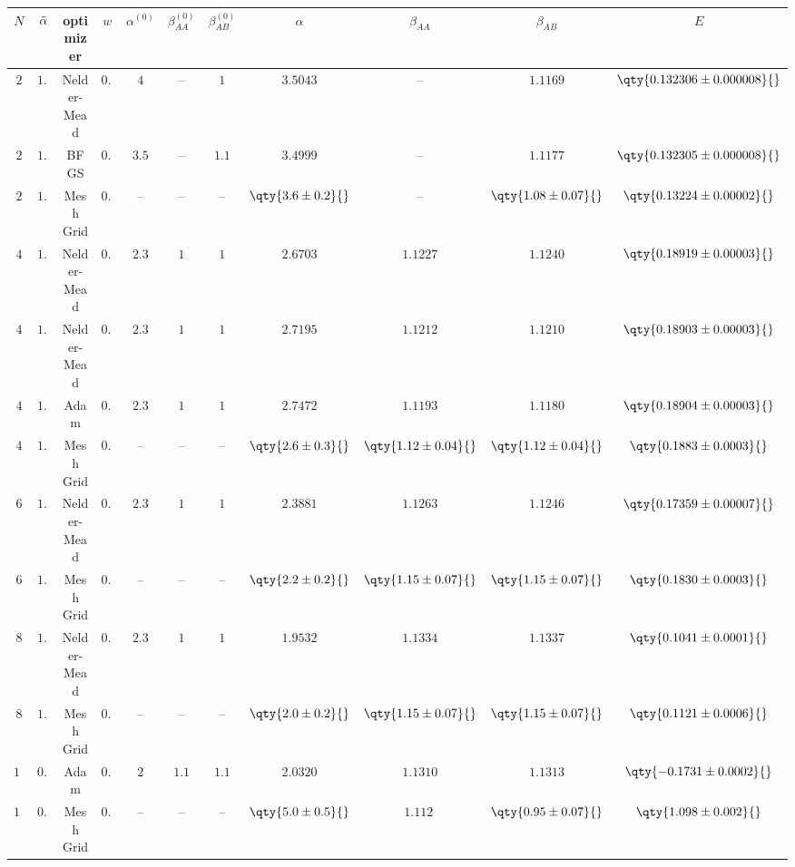 \begin{tabular}{cc|ccccc|cccc}
    $N$ & $\Tilde{\alpha}$ & optimizer & $w$ & $\alpha^{(0)}$ & $\beta_{AA}^{(0)}$ & $\beta_{AB}^{(0)}$ & $\alpha$ & $\beta_{AA}$ & $\beta_{AB}$ & $E$ \\ \hline \hline
    
    $2$ & $1.00$ & Nelder-Mead & $0.05$ & $4$ & -- & $1$ & $3.5043$ & -- & $1.1169$ & $\qty{0.132306 \pm 0.000008}{}$ \\
    \rowcolor{LightCyan}
    $2$ & $1.00$ & BFGS & $0.05$ & $3.5$ & -- & $1.1$ & $3.4999$ & -- & $1.1177$ & $\qty{0.132305 \pm 0.000008}{}$ \\
    $2$ & $1.00$ & Mesh Grid & $0.00$ & -- & -- & -- & $\qty{3.6 \pm 0.2}{}$ & -- & $\qty{1.08 \pm 0.07}{}$ & $\qty{0.13224 \pm 0.00002}{}$ \\
    $4$ & $1.00$ & Nelder-Mead & $0.05$ & $2.3$ & $1$ & $1$ & $2.6703$ & $1.1227$ & $1.1240$ & $\qty{0.18919 \pm 0.00003}{}$ \\
    \rowcolor{LightCyan}
    $4$ & $1.00$ & Nelder-Mead & $0.05$ & $2.3$ & $1$ & $1$ & $2.7195$ & $1.1212$ & $1.1210$ & $\qty{0.18903 \pm 0.00003}{}$ \\
    $4$ & $1.00$ & Adam & $0.05$ & $2.3$ & $1$ & $1$ & $2.7472$ & $1.1193$ & $1.1180$ & $\qty{0.18904 \pm 0.00003}{}$ \\
    $4$ & $1.00$ & Mesh Grid & $0.00$ & -- & -- & -- & $\qty{2.6 \pm 0.3}{}$ & $\qty{1.12 \pm 0.04}{}$ & $\qty{1.12 \pm 0.04}{}$ & $\qty{0.1883 \pm 0.0003}{}$ \\
    \rowcolor{LightCyan}
    $6$ & $1.00$ & Nelder-Mead & $0.05$ & $2.3$ & $1$ & $1$ & $2.3881$ & $1.1263$ & $1.1246$ & $\qty{0.17359 \pm 0.00007}{}$ \\
    $6$ & $1.00$ & Mesh Grid & $0.00$ & -- & -- & -- & $\qty{2.2 \pm 0.2}{}$ & $\qty{1.15 \pm 0.07}{}$ & $\qty{1.15 \pm 0.07}{}$ & $\qty{0.1830 \pm 0.0003}{}$ \\
    \rowcolor{LightCyan}
    $8$ &$1.00$ & Nelder-Mead & $0.05$ & $2.3$ & $1$ & $1$ & $1.9532$ & $1.1334$ & $1.1337$ & $\qty{0.1041 \pm 0.0001}{}$ \\
    $8$ & $1.00$ & Mesh Grid & $0.00$ & -- & -- & -- & $\qty{2.0 \pm 0.2}{}$ & $\qty{1.15 \pm 0.07}{}$ & $\qty{1.15 \pm 0.07}{}$ & $\qty{0.1121 \pm 0.0006}{}$ \\
    \rowcolor{LightCyan}
    $12$\tnote{$*$} & $0.05$ & Adam\tnote{$\ddagger$} & $0.05$ & $2$ & $1.1$ & $1.1$ & $2.0320$ & $1.1310$ & $1.1313$ & $\qty{-0.1731 \pm 0.0002}{}$ \\
    $12$\tnote{$*$} & $0.05$ & Mesh Grid & $0.00$ & -- & -- & -- & $\qty{5.0 \pm 0.5}{}$ & $\qty{1.112}{}$\tnote{$**$} & $\qty{0.95 \pm 0.07}{}$ & $\qty{1.098 \pm 0.002}{}$ \\ \hline


\end{tabular}

